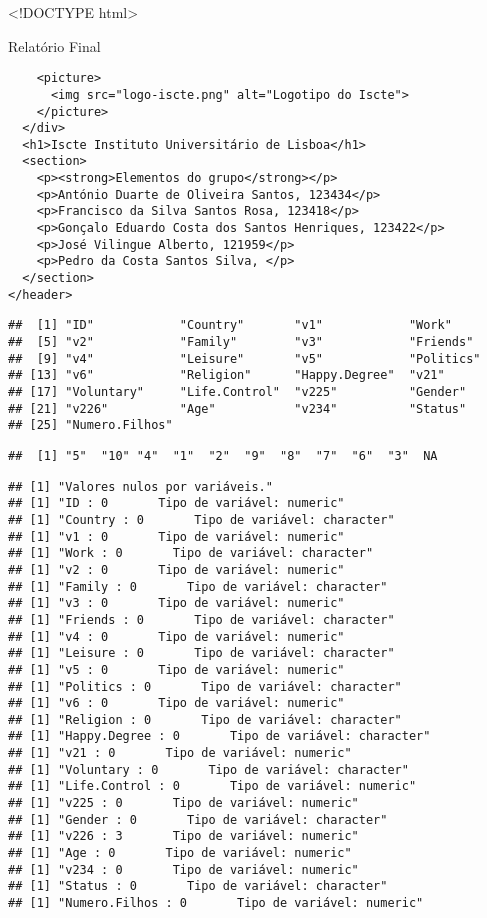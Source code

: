 \documentclass[
]{article}
\author{}
\date{\vspace{-2.5em}}
\begin{document}
\textless!DOCTYPE html\textgreater{}

Relatório Final

\begin{verbatim}
    <picture>
      <img src="logo-iscte.png" alt="Logotipo do Iscte">
    </picture>
  </div>
  <h1>Iscte Instituto Universitário de Lisboa</h1>
  <section>
    <p><strong>Elementos do grupo</strong></p>
    <p>António Duarte de Oliveira Santos, 123434</p>
    <p>Francisco da Silva Santos Rosa, 123418</p>
    <p>Gonçalo Eduardo Costa dos Santos Henriques, 123422</p>
    <p>José Vilingue Alberto, 121959</p>
    <p>Pedro da Costa Santos Silva, </p>
  </section>
</header>
\end{verbatim}

\begin{verbatim}
##  [1] "ID"            "Country"       "v1"            "Work"         
##  [5] "v2"            "Family"        "v3"            "Friends"      
##  [9] "v4"            "Leisure"       "v5"            "Politics"     
## [13] "v6"            "Religion"      "Happy.Degree"  "v21"          
## [17] "Voluntary"     "Life.Control"  "v225"          "Gender"       
## [21] "v226"          "Age"           "v234"          "Status"       
## [25] "Numero.Filhos"
\end{verbatim}

\begin{verbatim}
##  [1] "5"  "10" "4"  "1"  "2"  "9"  "8"  "7"  "6"  "3"  NA
\end{verbatim}

\begin{verbatim}
## [1] "Valores nulos por variáveis."
## [1] "ID : 0       Tipo de variável: numeric"
## [1] "Country : 0       Tipo de variável: character"
## [1] "v1 : 0       Tipo de variável: numeric"
## [1] "Work : 0       Tipo de variável: character"
## [1] "v2 : 0       Tipo de variável: numeric"
## [1] "Family : 0       Tipo de variável: character"
## [1] "v3 : 0       Tipo de variável: numeric"
## [1] "Friends : 0       Tipo de variável: character"
## [1] "v4 : 0       Tipo de variável: numeric"
## [1] "Leisure : 0       Tipo de variável: character"
## [1] "v5 : 0       Tipo de variável: numeric"
## [1] "Politics : 0       Tipo de variável: character"
## [1] "v6 : 0       Tipo de variável: numeric"
## [1] "Religion : 0       Tipo de variável: character"
## [1] "Happy.Degree : 0       Tipo de variável: character"
## [1] "v21 : 0       Tipo de variável: numeric"
## [1] "Voluntary : 0       Tipo de variável: character"
## [1] "Life.Control : 0       Tipo de variável: numeric"
## [1] "v225 : 0       Tipo de variável: numeric"
## [1] "Gender : 0       Tipo de variável: character"
## [1] "v226 : 3       Tipo de variável: numeric"
## [1] "Age : 0       Tipo de variável: numeric"
## [1] "v234 : 0       Tipo de variável: numeric"
## [1] "Status : 0       Tipo de variável: character"
## [1] "Numero.Filhos : 0       Tipo de variável: numeric"
\end{verbatim}
\end{document}
